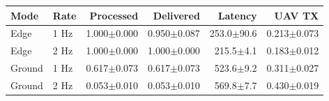 \begin{tabular}{llrrrr}
\hline
Mode & Rate & Processed & Delivered & Latency & UAV TX \\
\hline
Edge & 1 Hz & 1.000$\pm$0.000 & 0.950$\pm$0.087 & 253.0$\pm$90.6 & 0.213$\pm$0.073 \\
Edge & 2 Hz & 1.000$\pm$0.000 & 1.000$\pm$0.000 & 215.5$\pm$4.1 & 0.183$\pm$0.012 \\
Ground & 1 Hz & 0.617$\pm$0.073 & 0.617$\pm$0.073 & 523.6$\pm$9.2 & 0.311$\pm$0.027 \\
Ground & 2 Hz & 0.053$\pm$0.010 & 0.053$\pm$0.010 & 569.8$\pm$7.7 & 0.430$\pm$0.019 \\
\hline
\end{tabular}
